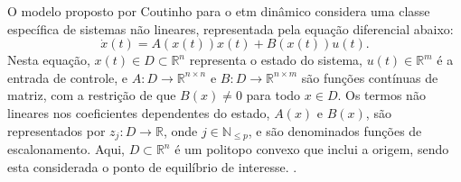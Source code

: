 O modelo proposto por Coutinho para o \acrshort{etm} dinâmico considera uma classe específica de sistemas não lineares, representada pela equação diferencial abaixo: \begin{equation} \dot{x}(t) = A(x(t))x(t) + B(x(t))u(t). \label{eq:etm-sys}\end{equation} Nesta equação, $ x(t) \in D \subset \mathbb{R}^n $ representa o estado do sistema, $ u(t) \in \mathbb{R}^m $ é a entrada de controle, e $ A: D \rightarrow \mathbb{R}^{n \times n} $ e $ B: D \rightarrow \mathbb{R}^{n \times m} $ são funções contínuas de matriz, com a restrição de que $ B(x) \neq 0 $ para todo $ x \in D $. Os termos não lineares nos coeficientes dependentes do estado, $ A(x) $ e $ B(x) $, são representados por $ z_j: D \rightarrow \mathbb{R} $, onde $ j \in \mathbb{N}_{\leq p} $, e são denominados funções de escalonamento. Aqui, $ D \subset \mathbb{R}^n $ é um politopo convexo que inclui a origem, sendo esta considerada o ponto de equilíbrio de interesse. \cite{coutinho2021}.

